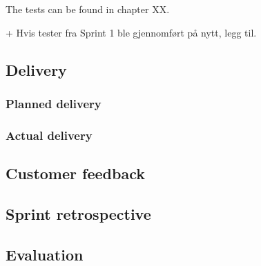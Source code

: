 The tests can be found in chapter XX.

+ Hvis tester fra Sprint 1 ble gjennomført på nytt, legg til.

\subsection{Delivery}
\subsubsection{Planned delivery}
\subsubsection{Actual delivery}
\subsection{Customer feedback}
\subsection{Sprint retrospective}
\subsection{Evaluation}
